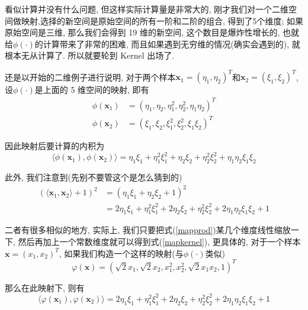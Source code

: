 \documentclass[a4paper,UTF8]{ctexart}
\theoremstyle{plain} \newtheorem{theorem}{定理}[section]
\theoremstyle{plain} \newtheorem{definition}{定义}[section]
\theoremstyle{plain} \newtheorem{lemma}{引理}[section]
\theoremstyle{plain} \newtheorem{proposition}{命题}[section]
\theoremstyle{plain} \newtheorem{example}{例}
\theoremstyle{plain} \newtheorem{remark}{注}
\theoremstyle{plain} \newtheorem{corollary}{推论}[section]
\begin{document}
看似计算并没有什么问题, 但这样实际计算量是非常大的, 刚才我们对一个二维空间做映射,选择的新空间是原始空间的所有一阶和二阶的组合, 得到了5个维度; 如果原始空间是三维, 那么我们会得到 19 维的新空间, 这个数目是爆炸性增长的, 也就给$\phi(\cdot)$的计算带来了非常的困难, 而且如果遇到无穷维的情况(确实会遇到的), 就根本无从计算了. 所以就要轮到 Kernel 出场了.

还是以开始的二维例子进行说明, 对于两个样本$\bm{x}_{1} = (\eta_1, \eta_2)^{T}$和$\bm{x}_{2} = (\xi_1, \xi_2)^{T}$, 设$\phi(\cdot)$是上面的 5 维空间的映射, 即有
\begin{align*}
\phi(\bm{x}_{1}) & = (\eta_1,\eta_2,\eta_{1}^{2},\eta_{2}^{2},\eta_1 \eta_2)^{T} \\ 
\phi(\bm{x}_{2}) & = (\xi_1,\xi_2,\xi_{1}^{2},\xi_{2}^{2},\xi_1 \xi_2)^{T}
\end{align*}

因此映射后要计算的内积为
\begin{equation}\label{mapprod}
\langle \phi(\bm{x}_1), \phi(\bm{x}_2) \rangle  = \eta_1 \xi_1 + \eta_{1}^{2} \xi_{1}^{2} + \eta_{2} \xi_{2} + \eta_{2}^{2} \xi_{2}^{2} + \eta_{1} \eta_{2} \xi_{1} \xi_{2}
\end{equation}

此外, 我们注意到(先别不要管这个是怎么猜到的)
\begin{equation}\label{mapkernel}
\begin{split}
\left(\langle \bm{x}_1, \bm{x}_2 \rangle + 1\right)^{2} & = (\eta_1 \xi_1 + \eta_2 \xi_2 + 1)^{2} \\ 
& = 2 \eta_1 \xi_1 + \eta_{1}^{2} \xi_{1}^{2} + 2 \eta_{2} \xi_{2} + \eta_{2}^{2} \xi_{2}^{2} + 2 \eta_{1} \eta_{2} \xi_{1} \xi_{2} + 1
\end{split}
\end{equation}

二者有很多相似的地方, 实际上, 我们只要把式(\ref{mapprod})某几个维度线性缩放一下, 然后再加上一个常数维度就可以得到式(\ref{mapkernel}), 更具体的, 对于一个样本$\bm{x} = (x_{1},x_{2})^{T}$, 如果我们构造一个这样的映射(与$\phi(\cdot)$类似)
\begin{equation*}
\varphi (\bm{x}) = (\sqrt{2} x_{1}, \sqrt{2} x_{2}, x_{1}^{2}, x_{2}^{2}, \sqrt{2} x_{1} x_{2}, 1)^{T}
\end{equation*}

那么在此映射下, 则有
\begin{equation}\label{newmap}
\langle \varphi(\bm{x}_1), \varphi(\bm{x}_2) \rangle = 2 \eta_1 \xi_1 + \eta_{1}^{2} \xi_{1}^{2} + 2 \eta_{2} \xi_{2} + \eta_{2}^{2} \xi_{2}^{2} + 2 \eta_{1} \eta_{2} \xi_{1} \xi_{2} + 1
\end{equation}
\end{document}
